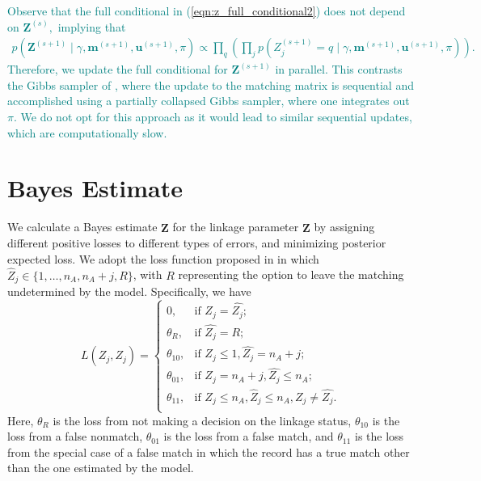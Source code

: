 \documentclass[ba]{imsart}
\begin{document}
\textcolor{teal}{Observe that the full conditional in (\ref{eqn:z_full_conditional2}) does not depend on $\bm{Z}^{(s)},$ implying that 
\begin{align}
p(\bm{Z}^{(s+1)} \mid \gamma, \bm{m}^{(s+1)}, \bm{u}^{(s+1)}, \pi) \propto \prod_q \left(\prod_j
p\left(Z_j^{(s+1)}  = q \mid \gamma, \bm{m}^{(s+1)}, \bm{u}^{(s+1)}, \pi \right)
\right).
\end{align}
Therefore, we update the full conditional for $\bm{Z}^{(s+1)}$ in parallel. This contrasts the Gibbs sampler of  \cite{sadinle_bayesian_2017}, where the update to the matching matrix is sequential and accomplished using a partially collapsed Gibbs sampler, where one integrates out $\pi.$ We do not opt for this approach as it would lead to similar sequential updates, which are computationally slow.}



\hypertarget{bayes-estimate}{%
		\section{Bayes Estimate}
		\label{bayes-estimate}}
	
We calculate a Bayes estimate $\hat{\bm{Z}}$ for the linkage parameter $\bm{Z}$ by assigning different positive losses to different types of errors, and minimizing posterior expected loss. We adopt the loss function proposed in \cite{sadinle_bayesian_2017} in which $\hat{Z}_j \in \{1, \ldots, n_A, n_A + j, R\}$, with $R$ representing the option to leave the matching undetermined by the model. Specifically, we have
	\[L(\hat{Z_j}, Z_j)=\begin{cases} 
		0,  & \text{if } Z_j = \hat{Z_j}; \\
		\theta_R,  & \text{if } \hat{Z_j} = R; \\
		\theta_{10},  & \text{if } Z_j \leq 1,\hat{Z_j} = n_A + j ; \\
		\theta_{01},  & \text{if } Z_j = n_A + j,\hat{Z_j} \leq n_A ; \\
		\theta_{11},  & \text{if } Z_j \leq n_A, \hat{Z}_j \leq n_A, Z_j \neq \hat{Z_j}. \\
	\end{cases}\] 
Here, $\theta_R$ is the loss from not making a decision on the linkage status, $\theta_{10}$ is the loss from a false nonmatch, $\theta_{01}$ is the loss from a false match, and $\theta_{11}$ is the loss from the special case of a false match in which the record has a true match other than the one estimated by the model. 
\end{document}
